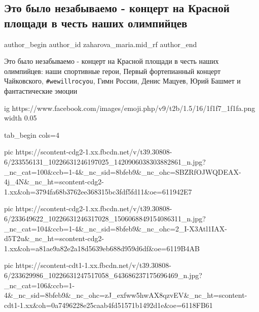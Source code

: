  
 
 
 
 
 
\subsection{Это было незабываемо - концерт на Красной  площади в честь наших олимпийцев}
\label{sec:08_08_2021.fb.zaharova_maria.mid_rf.1.koncert_olimpijcy}
 
\ifcmt
 author_begin
   author_id zaharova_maria.mid_rf
 author_end
\fi

Это было незабываемо - концерт на Красной  площади в честь наших олимпийцев:
наши спортивные герои, Первый фортепианный концерт Чайковского, \verb|#wewillrocyou|,
Гимн России, Денис Мацуев, Юрий Башмет и фантастические эмоции 

\ifcmt
  ig https://www.facebook.com/images/emoji.php/v9/t2b/1.5/16/1f1f7_1f1fa.png
  width 0.05
\fi

\ifcmt
  tab_begin cols=4

     pic https://scontent-cdg2-1.xx.fbcdn.net/v/t39.30808-6/233556131_10226631246197025_1420906038303882861_n.jpg?_nc_cat=100&ccb=1-4&_nc_sid=8bfeb9&_nc_ohc=SBZRfOJWQDEAX-4j_4N&_nc_ht=scontent-cdg2-1.xx&oh=3794fa68b3762ee368315bc3fdf5fd11&oe=611942E7

     pic https://scontent-cdg2-1.xx.fbcdn.net/v/t39.30808-6/233649622_10226631246317028_1506068849154086311_n.jpg?_nc_cat=104&ccb=1-4&_nc_sid=8bfeb9&_nc_ohc=2_I-X3Atl1IAX-d5T2u&_nc_ht=scontent-cdg2-1.xx&oh=a81ae9a82e2a18d5639eb688d959d6df&oe=6119B4AB

     pic https://scontent-cdt1-1.xx.fbcdn.net/v/t39.30808-6/233629986_10226631247517058_643686237175696469_n.jpg?_nc_cat=106&ccb=1-4&_nc_sid=8bfeb9&_nc_ohc=zJ_exfww5hwAX8qzvEV&_nc_ht=scontent-cdt1-1.xx&oh=0a7496228e25caab4fd51571b1492d1e&oe=6118FB61

